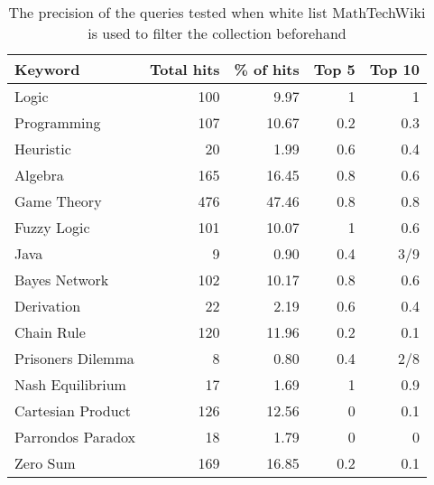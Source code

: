 \begin{table}[H]
\centering
\begin{tabular} {|| p{10em} | r | r | r | r ||} 
 \hline
 Keyword & Total hits & \% of hits & Top 5 & Top 10 \\ [0.5ex] 
 \hline

Logic & 100 & 9.97 & 1 & 1 \\
Programming & 107 & 10.67 & 0.2 & 0.3 \\
Heuristic & 20 & 1.99 & 0.6 & 0.4 \\
Algebra & 165 & 16.45 & 0.8 & 0.6 \\
Game Theory & 476 & 47.46 & 0.8 & 0.8 \\
\hline
Fuzzy Logic & 101 & 10.07 & 1 & 0.6 \\
Java & 9 & 0.90 & 0.4 & 3/9 \\
Bayes Network & 102 & 10.17 & 0.8 & 0.6 \\
Derivation & 22 & 2.19 & 0.6 & 0.4 \\
\hline
Chain Rule & 120 & 11.96 & 0.2 & 0.1 \\
Prisoners Dilemma & 8 & 0.80 & 0.4 & 2/8 \\
Nash Equilibrium & 17 & 1.69 & 1 & 0.9 \\
Cartesian Product & 126 & 12.56 & 0 & 0.1 \\
Parrondos Paradox & 18 & 1.79 & 0 & 0 \\
Zero Sum & 169 & 16.85 & 0.2 & 0.1 \\

 \hline
\end{tabular}
\caption{The precision of the queries tested when white list MathTechWiki is used to filter the collection beforehand}
\label{table:p_test_list4}
\end{table}




\cleardoublepage